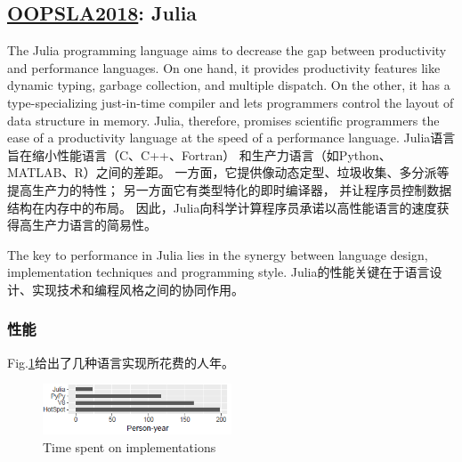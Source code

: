 \subsection{\href{https://dl.acm.org/citation.cfm?id=3276490}{OOPSLA2018}: Julia}
\label{paper:oopsla2018Julia}

The Julia programming language aims to decrease the gap between productivity and performance
languages. On one hand, it provides productivity features like dynamic typing, garbage collection,
and multiple dispatch. On the other, it has a type-specializing just-in-time compiler and lets
programmers control the layout of data structure in memory. Julia, therefore, promises scientific
programmers the ease of a productivity language at the speed of a performance language.
Julia语言旨在缩小性能语言（C、C++、Fortran）
和生产力语言（如Python、MATLAB、R）之间的差距。
一方面，它提供像动态定型、垃圾收集、多分派等提高生产力的特性；
另一方面它有类型特化的即时编译器，
并让程序员控制数据结构在内存中的布局。
因此，Julia向科学计算程序员承诺以高性能语言的速度获得高生产力语言的简易性。

The key to performance in Julia lies in the synergy
between language design, implementation techniques and
programming style.
Julia的性能关键在于语言设计、实现技术和编程风格之间的协同作用。

\subsubsection{性能}
\label{paper:oopsla2018Julia:perf}
Fig.\ref{fig:julia:personyear}给出了几种语言实现所花费的人年。
\begin{figure}[htbp]
    \centering
    \includegraphics[width=0.5\textwidth]{img/julia-personyear.png}
    \caption{Time spent on implementations}
    \label{fig:julia:personyear}
\end{figure}

